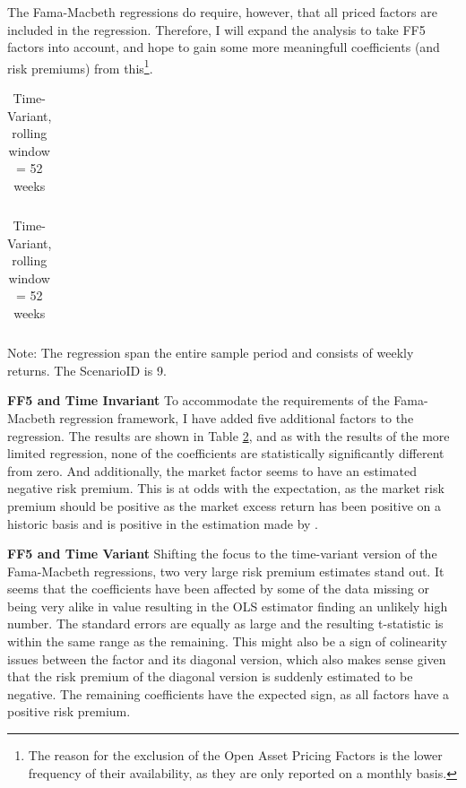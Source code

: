 The Fama-Macbeth regressions do require, however, that all priced factors are included in the regression. Therefore, I will expand the analysis to take FF5 factors into account, and hope to gain some more meaningfull coefficients (and risk premiums) from this\footnote{The reason for the exclusion of the Open Asset Pricing Factors is the lower frequency of their availability, as they are only reported on a monthly basis.}.

\begin{table}[ht]
	\centering
	
	\caption[Fama-Macbeth Regression, FF5]{Fama-Macbeth Regressions, using FF5}
	\label{tab:fm_FF5_9}
	
	\begin{subtable}[t]{0.55\textwidth}
		\caption[C]{Time-Invariant}
		\begin{tabular}{l|rrrr}
			
		\end{tabular}
	\end{subtable}
	
	\begin{subtable}[t]{0.55\textwidth}
		\caption[C]{Time-Variant, rolling window = 52 weeks}
		\begin{tabular}{l|rrrr}
			
		\end{tabular}
	\end{subtable}
	
	{\small Note: The regression span the entire sample period and consists of weekly returns. The ScenarioID is 9.}
	
\end{table}

\textbf{FF5 and Time Invariant} To accommodate the requirements of the Fama-Macbeth regression framework, I have added five additional factors to the regression. The results are shown in Table \ref{tab:fm_FF5_9}, and as with the results of the more limited regression, none of the coefficients are statistically significantly different from zero. And additionally, the market factor seems to have an estimated negative risk premium. This is at odds with the expectation, as the market risk premium should be positive as the market excess return has been positive on a historic basis and is positive in the estimation made by \cite{giglio2021asset}. 

\textbf{FF5 and Time Variant} Shifting the focus to the time-variant version of the Fama-Macbeth regressions, two very large risk premium estimates stand out. It seems that the coefficients have been affected by some of the data missing or being very alike in value resulting in the OLS estimator finding an unlikely high number. The standard errors are equally as large and the resulting t-statistic is within the same range as the remaining. This might also be a sign of colinearity issues between the factor and its diagonal version, which also makes sense given that the risk premium of the diagonal version is suddenly estimated to be negative. The remaining coefficients have the expected sign, as all factors have a positive risk premium. 

